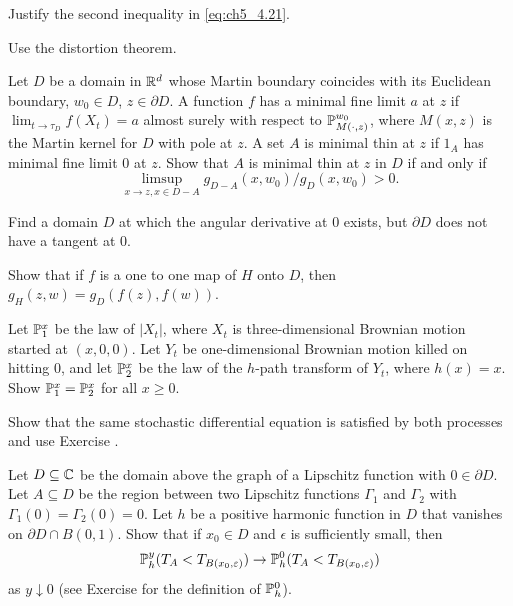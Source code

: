 \begin{exercise}\label{ex:ch5_15}
Justify the second inequality in \eqref{eq:ch5_4.21}.

\hint Use the distortion theorem.
\end{exercise}

\begin{exercise}\label{ex:ch5_16}
Let $D$ be a domain in $\R^d$ whose Martin boundary coincides with its Euclidean boundary, $w_0 \in D$, $z \in \partial D$. A function $f$ has a minimal fine limit $a$ at $z$ if $\lim_{t\to\tau_D} f(X_t) = a$ almost surely with respect to $\P^{w_0}_{M(\cdot,z)}$, where $M(x,z)$ is the Martin kernel for $D$ with pole at $z$. A set $A$ is minimal thin at $z$ if $1_A$ has minimal fine limit $0$ at $z$. Show that $A$ is minimal thin at $z$ in $D$ if and only if
\[
    \limsup_{x\to z,x\in D-A} g_{D-A}(x,w_0)/g_D(x,w_0) > 0.
\]
\end{exercise}

\begin{exercise}\label{ex:ch5_17}
Find a domain $D$ at which the angular derivative at $0$ exists, but $\partial D$ does not have a tangent at $0$.
\end{exercise}

\begin{exercise}\label{ex:ch5_18}
Show that if $f$ is a one to one map of $H$ onto $D$, then $g_H(z,w) = g_D(f(z),f(w))$.
\end{exercise}

\begin{exercise}\label{ex:ch5_19}
Let $\P_1^x$ be the law of $|X_t|$, where $X_t$ is three-dimensional Brownian motion started at $(x,0,0)$. Let $Y_t$ be one-dimensional Brownian motion killed on hitting $0$, and let $\P_2^x$ be the law of the $h$-path transform of $Y_t$, where $h(x) = x$. Show $\P_1^x = \P_2^x$ for all $x \geq 0$.

\hint Show that the same stochastic differential equation is satisfied by both processes and use Exercise .
\end{exercise}

\begin{exercise}\label{ex:ch5_20}
Let $D \subseteq \C$ be the domain above the graph of a Lipschitz function with $0 \in \partial D$. Let $A \subseteq D$ be the region between two Lipschitz functions $\Gamma_1$ and $\Gamma_2$ with $\Gamma_1(0) = \Gamma_2(0) = 0$. Let $h$ be a positive harmonic function in $D$ that vanishes on $\partial D \cap B(0,1)$. Show that if $x_0 \in D$ and $\epsilon$ is sufficiently small, then
\[
    \P_h^y(T_A < T_{B(x_0,\epsilon)}) \to \P_h^0(T_A < T_{B(x_0,\epsilon)})
\]
as $y \downarrow 0$ (see Exercise  for the definition of $\P_h^0$).
\end{exercise}

